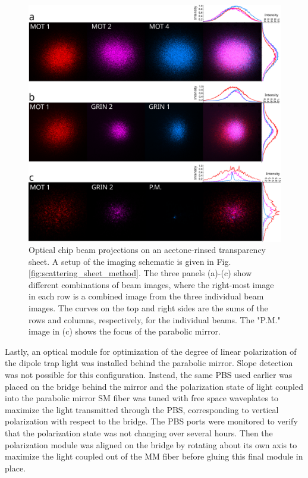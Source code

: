 \begin{figure}[t!]
    \centering
    \includegraphics[width=\textwidth]{Images/transparency_sheet_beam_projections.pdf}
    \caption{Optical chip beam projections on an acetone-rinsed transparency sheet. A setup of the imaging schematic is given in Fig. \ref{fig:scattering_sheet_method}. The three panels (a)-(c) show different combinations of beam images, where the right-most image in each row is a combined image from the three individual beam images. The curves on the top and right sides are the sums of the rows and columns, respectively, for the individual beams. The "P.M." image in (c) shows the focus of the parabolic mirror.}
    \label{fig:final_beam_projections}
\end{figure}

Lastly, an optical module for optimization of the degree of linear polarization of the dipole trap light was installed behind the parabolic mirror. Slope detection was not possible for this configuration. Instead, the same PBS used earlier was placed on the bridge behind the mirror and the polarization state of light coupled into the parabolic mirror SM fiber was tuned with free space waveplates to maximize the light transmitted through the PBS, corresponding to vertical polarization with respect to the bridge. The PBS ports were monitored to verify that the polarization state was not changing over several hours. Then the polarization module was aligned on the bridge by rotating about its own axis to maximize the light coupled out of the MM fiber before gluing this final module in place.

